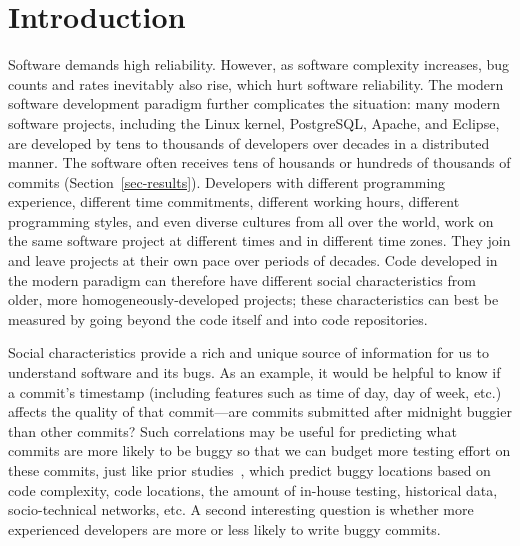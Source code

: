 \section{Introduction}

Software demands high reliability. However, as software complexity increases, 
bug counts and rates inevitably also rise, which hurt software reliability.
The modern software development paradigm further complicates the situation: 
many modern software projects, including the Linux kernel, PostgreSQL, 
Apache, and Eclipse, 
are developed by tens to thousands of developers over decades %
in a distributed manner. The software often receives tens of housands or hundreds of thousands 
of commits (Section~\ref{sec-results}). 
Developers with different programming experience, 
different time commitments, different working hours, different programming styles, and even diverse cultures from all over the world,
work on the same software project at different times and in different time zones. They join and leave projects 
at their own pace over periods of decades. 
Code developed in the modern paradigm can therefore have different 
social characteristics from older, more homogeneously-developed projects;
these characteristics can best be measured by going beyond the code itself and 
into code repositories.

Social characteristics provide a rich and unique source of information for us to 
understand software and its bugs. As an example, it would be helpful to know if  
a commit's timestamp (including features such as time of day, day of week, etc.) affects the quality of that commit---are commits submitted after midnight buggier than other commits? 
Such correlations may be useful for predicting what commits are more likely
to be buggy so that we can budget more testing effort on these commits, just like prior 
studies~\cite{graves00predicting, guo04robust, Hassan09, libre07, devNetwork08, predictionMenzies10, effort03, ostrand05predicting, 
depGraph08, zimmermann-promise-2007},
which predict buggy locations based on code complexity, 
code locations, the amount of in-house testing, historical data, socio-technical networks, etc. 
A second interesting question is whether more experienced developers are more or less
likely to write buggy commits. 




